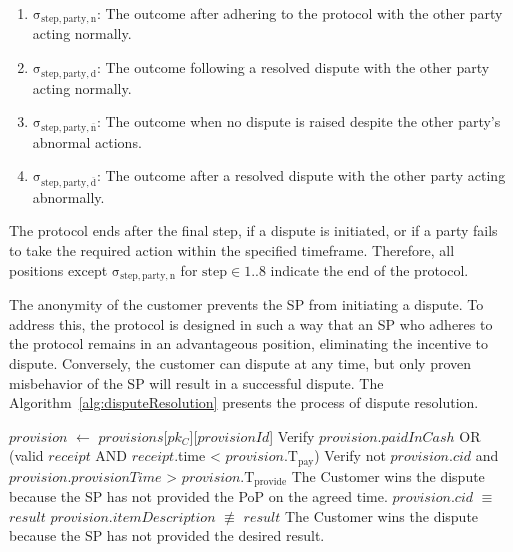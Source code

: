 \documentclass[pdftex,twocolumn,epjc3]{svjour3}
\newcommand{\normal}{\mathrm{n}}
\newcommand{\dispute}{\mathrm{d}}
\newcommand{\abnormal}{\overline{\mathrm{n}}}
\newcommand{\abdispute}{\overline{\mathrm{d}}}
\begin{document}
\begin{enumerate}
\item $\mathrm{\sigma_{step,party,\normal{}}}$: The outcome after adhering to the protocol with the other party acting normally.
\item $\mathrm{\sigma_{step,party,\dispute{}}}$: The outcome following a resolved dispute with the other party acting normally.
\item $\mathrm{\sigma_{step,party,\abnormal{}}}$: The outcome when no dispute is raised despite the other party's abnormal actions.
\item $\mathrm{\sigma_{step,party,\abdispute{}}}$: The outcome after a resolved dispute with the other party acting abnormally.
\end{enumerate}

\begin{sloppypar}
The protocol ends after the final step, if a dispute is initiated, or if a party fails to take the required action within the specified timeframe. Therefore, all positions except $\mathrm{\sigma_{step, party, n}}$ for $\mathrm{step} \in 1..8$ indicate the end of the protocol.
\end{sloppypar}

The anonymity of the customer prevents the SP from initiating a dispute. To address this, the protocol is designed in such a way that an SP who adheres to the protocol remains in an advantageous position, eliminating the incentive to dispute. Conversely, the customer can dispute at any time, but only proven misbehavior of the SP will result in a successful dispute. The Algorithm~\ref{alg:disputeResolution} presents the process of dispute resolution.

\begin{algorithm}
\caption{Algorithm for Dispute Resolution}
\label{alg:disputeResolution}
\begin{algorithmic}[1]

    \State $provision$ $\gets$ $provisions$[$pk_C$][$provisionId$]
    \State Verify $provision$.$paidInCash$ OR  (valid $receipt$ AND $receipt$.time < $provision$.$\mathrm{T}_\mathrm{pay}$)
    \State Verify not $provision$.$cid$ and $provision$.$provisionTime$ > $provision$.$\mathrm{T}_\mathrm{provide}$
    \State \Return The Customer wins the dispute because the SP has not provided the PoP on the agreed time.
    \EndIf
        \State $provision$.$cid$ $\equiv$ $result$
        \State $provision$.$itemDescription$ $\not\equiv$ $result$
        \State \Return The Customer wins the dispute because the SP has not provided the desired result.
    \EndIf
\EndFunction
\end{algorithmic}
\end{algorithm}
\end{document}
